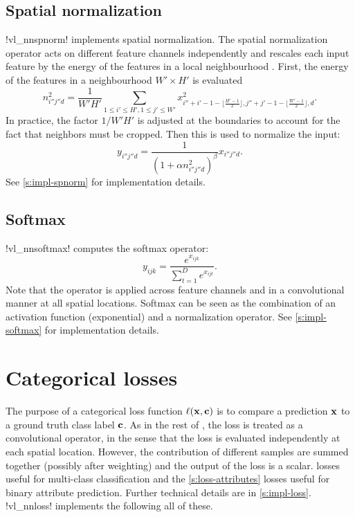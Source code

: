 \subsection{Spatial normalization}\label{s:spnorm}

!vl_nnspnorm! implements spatial normalization. The spatial normalization operator acts on different feature channels independently and rescales each input feature by the energy of the features in a local neighbourhood . First, the energy of the features in a neighbourhood $W'\times H'$ is evaluated
\[
n_{i''j''d}^2 = \frac{1}{W'H'}
\sum_{1\leq i' \leq H', 1 \leq j' \leq W'} x^2_{
i''+i'-1-\lfloor \frac{H'-1}{2}\rfloor,
j''+j'-1-\lfloor \frac{W'-1}{2}\rfloor,
d}.
\]
In practice, the factor $1/W'H'$ is adjusted at the boundaries to account for the fact that neighbors must be cropped. Then this is used to normalize the input:
\[
y_{i''j''d} = \frac{1}{(1 + \alpha n_{i''j''d}^2)^\beta} x_{i''j''d}.
\]
See \cref{s:impl-spnorm} for implementation details.

\subsection{Softmax}\label{s:softmax}

!vl_nnsoftmax! computes the softmax operator:
\[
 y_{ijk} = \frac{e^{x_{ijk}}}{\sum_{t=1}^D e^{x_{ijt}}}.
\]
Note that the operator is applied across feature channels and in a convolutional manner at all spatial locations. Softmax can be seen as the combination of an activation function (exponential) and a normalization operator. See \cref{s:impl-softmax} for implementation details.

\section{Categorical losses}\label{s:losses}

The purpose of a categorical loss function $\ell(\mathbf{x},\mathbf{c})$ is to compare a prediction $\mathbf{x}$ to a ground truth class label $\mathbf{c}$. As in the rest of \matconvnet, the loss is treated as a convolutional operator, in the sense that the loss is evaluated independently at each spatial location. However, the contribution of different samples are summed together (possibly after weighting) and the output of the loss is a scalar.  losses useful for multi-class classification and the \cref{s:loss-attributes} losses useful for binary attribute prediction. Further technical details are in \cref{s:impl-loss}. !vl_nnloss! implements the following all of these.

